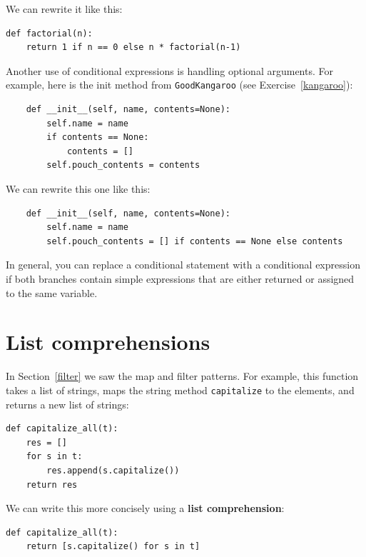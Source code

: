 \documentclass[10pt]{book}
\begin{document}
We can rewrite it like this:

\begin{verbatim}
def factorial(n):
    return 1 if n == 0 else n * factorial(n-1)
\end{verbatim}

Another use of conditional expressions is handling optional
arguments.  For example, here is the init method from
{\tt GoodKangaroo} (see Exercise~\ref{kangaroo}):

\begin{verbatim}
    def __init__(self, name, contents=None):
        self.name = name
        if contents == None:
            contents = []
        self.pouch_contents = contents
\end{verbatim}

We can rewrite this one like this:

\begin{verbatim}
    def __init__(self, name, contents=None):
        self.name = name
        self.pouch_contents = [] if contents == None else contents 
\end{verbatim}

In general, you can replace a conditional statement with a conditional
expression if both branches contain simple expressions that are
either returned or assigned to the same variable.



\section{List comprehensions}

In Section~\ref{filter} we saw the map and filter patterns.  For
example, this function takes a list of strings, maps the string method
{\tt capitalize} to the elements, and returns a new list of strings:

\begin{verbatim}
def capitalize_all(t):
    res = []
    for s in t:
        res.append(s.capitalize())
    return res
\end{verbatim}

We can write this more concisely using a {\bf list comprehension}:

\begin{verbatim}
def capitalize_all(t):
    return [s.capitalize() for s in t]
\end{verbatim}
\end{document}
